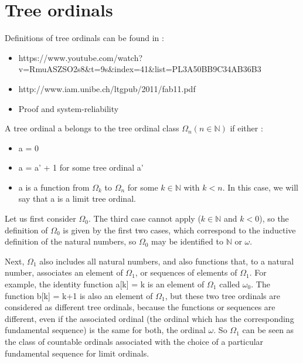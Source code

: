 \documentclass[10pt]{article}
\begin{document}
\section{Tree ordinals}

Definitions of tree ordinals can be found in :

\begin{itemize}
     \setlength{\itemsep}{1pt}
     \setlength{\parskip}{0pt}
     \setlength{\parsep}{0pt}
\item https://www.youtube.com/watch?v=RmuASZSO2s8\&t=9s\&index=41\&list=PL3A50BB9C34AB36B3
\item http://www.iam.unibe.ch/ltgpub/2011/fab11.pdf
\item Proof and system-reliability
\end{itemize}

A tree ordinal a belongs to the tree ordinal class \( \Omega_n (n \in \mathbb{N}) \) if either :
\begin{itemize}
     \setlength{\itemsep}{1pt}
     \setlength{\parskip}{0pt}
     \setlength{\parsep}{0pt}
\item a = 0
\item a = a' + 1 for some tree ordinal a'
\item a is a function from \( \Omega_k \) to \( \Omega_n \) for some \( k \in \mathbb{N} \) with \( k < n \). In this case, we will say that a is a limit tree ordinal.
\end{itemize}

Let us first consider \( \Omega_0 \). The third case cannot apply (\( k \in \mathbb{N} \) and \(k < 0 \)), so the definition of \( \Omega_0 \) is given by the first two cases, which correspond to the inductive definition of the natural numbers, so \( \Omega_0 \) may be identified to \( \mathbb{N} \) or \( \omega \).

Next, \( \Omega_1 \) also includes all natural numbers, and also functions that, to a natural number, associates an element of \( \Omega_1 \), or sequences of elements of \( \Omega_1 \). For example, the identity function a[k] = k is an element of \( \Omega_1 \) called \( \omega_0 \). The function b[k] = k+1 is also an element of \( \Omega_1 \), but these two tree ordinals are considered as different tree ordinals, because the functions or sequences are different, even if the associated ordinal (the ordinal which has the corresponding fundamental sequence) is the same for both, the ordinal \( \omega \). So \( \Omega_1 \) can be seen as the class of countable ordinals associated with the choice of a particular fundamental sequence for limit ordinals.
\end{document}
